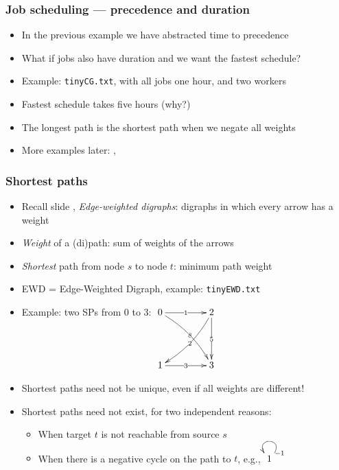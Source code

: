 \documentclass[handout]{beamer}
\newcommand{\git}{https://github.com/marcbezem/INF102/blob/master}
\begin{document}
\begin{frame}
    \frametitle{Job scheduling --- precedence and duration}\label{Job_dur}

\begin{itemize}[<+->]

\item In the previous example we have abstracted time to precedence
\item What if jobs also have duration and we want the fastest schedule?
\item Example: {\tt tinyCG.txt}, with all jobs one hour, and two workers
\item Fastest schedule takes five hours (why?)
\item The longest path is the shortest path when we negate all weights
\item More examples later: \href{\git/programs/tinyJob.txt}%
{\color{red}{\tt tinyJob.txt}}, \href{\git/programs/tiNoJob.txt}%
{\color{red}{\tt tiNoJob.txt}}
\end{itemize} 
\end{frame}


\begin{frame}
    \frametitle{Shortest paths}\label{SPintro}

\begin{itemize}[<+->]
\item Recall slide \hyperlink{graph_classes}{\color{red}{\pageref{graph_classes}}}, 
\emph{Edge-weighted digraphs}: digraphs  in which every arrow has a weight
\item \emph{Weight} of a (di)path: sum of weights of the arrows
\item \emph{Shortest} path from node $s$ to node $t$: minimum path weight
\item EWD = Edge-Weighted Digraph, example: {\tt tinyEWD.txt}
\item Example: two SPs from 0 to 3: $\xymatrix@R=1.5cm@C=1.5cm{
0\ar@{>}[r]|1 \ar@/^/[rd]|8 &2\ar@/^/[ld]|2 \ar@{>}[d]|5\\1\ar@{>}[r]|3  &3 }$
\item Shortest paths need not be unique, even if all weights are different!
\item Shortest paths need not exist, for two independent reasons:
  \begin{itemize}[<+->]
  \item When target $t$ is not reachable from source $s$
  \item When there is a negative cycle on the path to $t$,
        e.g., $\xymatrix@R=0.5cm@C=0.5cm{1\ar@(ur,ul)}^{-1}$
  \end{itemize}
\end{itemize} 
\end{frame}
\end{document}
